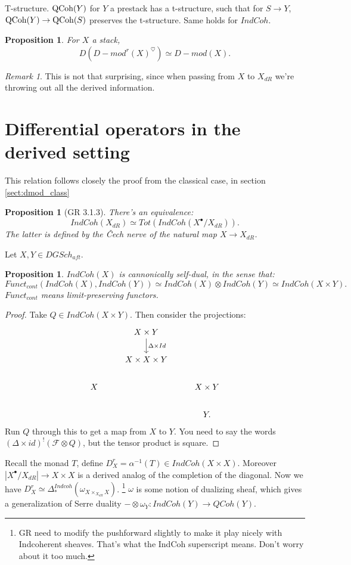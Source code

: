\documentclass[10pt,a4paper,reqno,oneside]{book} %
\theoremstyle{plain}
\newtheorem{prop}[thm]{Proposition}
\theoremstyle{definition}
\theoremstyle{remark}
\newtheorem{rem}[thm]{Remark}
\numberwithin{equation}{section}
\begin{document}
T-structure. $\mathrm{QCoh}(Y)$ for $Y$ a prestack has a t-structure, such that for $S \to Y$, $\mathrm{QCoh}(Y) \to \mathrm{QCoh}(S)$ preserves
the t-structure. Same holds for $IndCoh$.

\begin{prop}
For $X$ a stack,
\[	D (D-mod^r(X)^{\heartsuit}) \simeq D-mod(X)	.\]
\end{prop}

\begin{rem}
This is not that surprising, since when passing from $X$ to $X_{dR}$ we're throwing out all the derived information.
\end{rem}


\section{Differential operators in the derived setting}
This relation follows closely the proof from the classical case, in section \ref{sect:dmod_class}

\begin{prop}[GR 3.1.3]
There's an equivalence:
\[	IndCoh(X_{dR}) \simeq Tot(IndCoh(X^{\bullet}/X_{dR})).	\]
The latter is defined by the \v{C}ech nerve of the natural map $X \to X_{dR}$.
\end{prop}

Let $X,Y \in DGSch_{aft}$.
\begin{prop}
$IndCoh(X)$ is cannonically self-dual, in the sense that:
\[	Funct_{cont}(IndCoh(X), IndCoh(Y)) \simeq IndCoh(X) \otimes IndCoh(Y) \simeq IndCoh(X \times Y).	\]
$Funct_{cont}$ means limit-preserving functors.
\end{prop}
\begin{proof}
Take $Q \in IndCoh(X \times Y)$. Then consider the projections:
\[
\begin{tikzcd}
\; & X  \times Y\arrow{d}{\Delta \times Id} & \\
\; & X \times X \times Y & \\
X & & X \times Y \\
& & Y .
\end{tikzcd}
\]
Run $Q$ through this to get a map from $X$ to $Y$. You need to say the words $(\Delta \times id)^! (\mathcal{F} \otimes
Q)$, but the tensor product is square.
\end{proof}

Recall the monad $T$, define $D_X^r = \alpha^{-1}(T) \in IndCoh(X\times X)$. Moreover $|X^{\bullet}/X_{dR}| \to X \times X$
is a derived analog of the completion of the diagonal. Now we have $D_X^r \simeq \Delta_*^{Indcoh}(\omega_{X \times_{X_{dR}} X})$.
\footnote{GR need to modify the pushforward slightly to make it play nicely with Indcoherent sheaves. That's what the
IndCoh superscript means. Don't worry about it too much.} $\omega$ is some notion of dualizing sheaf, which gives a generalization
of Serre duality $ - \otimes \omega_Y : IndCoh(Y) \to QCoh(Y)$.
\end{document}
